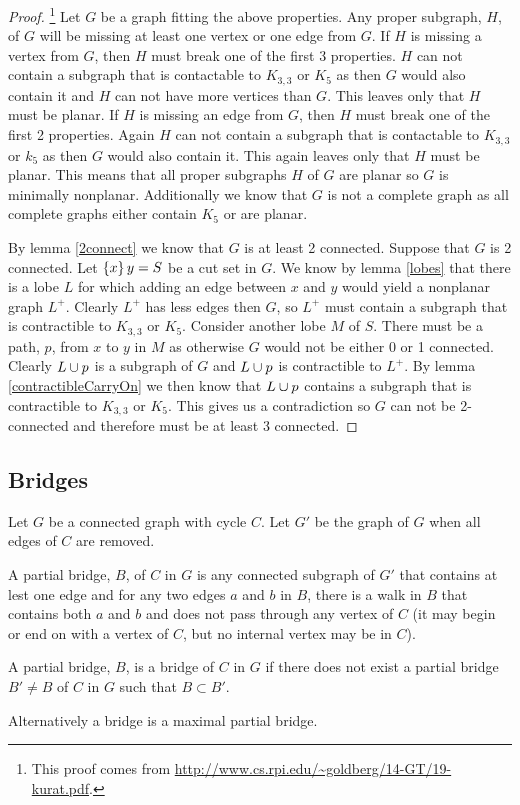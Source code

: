 \documentclass{article}
\begin{document}
\begin{proof}\footnote{This proof comes from \url{http://www.cs.rpi.edu/~goldberg/14-GT/19-kurat.pdf}.}
	Let $G$ be a graph fitting the above properties. Any proper subgraph, $H$, of $G$ will be missing at least one vertex or one edge from $G$. If $H$ is missing a vertex from $G$, then $H$ must break one of the first 3 properties. $H$ can not contain a subgraph that is contactable to $K_{3,3}$ or $K_5$ as then $G$ would also contain it and $H$ can not have more vertices than $G$. This leaves only that $H$ must be planar. If $H$ is missing an edge from $G$, then $H$ must break one of the first 2 properties. Again $H$ can not contain a subgraph that is contactable to $K_{3,3}$ or $k_5$ as then $G$ would also contain it. This again leaves only that $H$ must be planar. This means that all proper subgraphs $H$ of $G$ are planar so $G$ is minimally nonplanar. Additionally we know that $G$ is not a complete graph as all complete graphs either contain $K_5$ or are planar.
	
	By lemma \ref{2connect} we know that $G$ is at least 2 connected. Suppose that $G$ is 2 connected. Let $\left\{ {x} \right\}y = S$ be a cut set in $G$. We know by lemma \ref{lobes} that there is a lobe $L$ for which adding an edge between $x$ and $y$ would yield a nonplanar graph $L^+$. Clearly $L^+$ has less edges then $G$, so $L^+$ must contain a subgraph that is contractible to $K_{3,3}$ or $K_{5}$. Consider another lobe $M$ of $S$. There must be a path, $p$, from $x$ to $y$ in $M$ as otherwise $G$ would not be either 0 or 1 connected. Clearly $L\cup p$ is a subgraph of $G$ and $L\cup p$ is contractible to $L^+$. By lemma \ref{contractibleCarryOn} we then know that $L\cup p$ contains a subgraph that is contractible to $K_{3,3}$ or $K_5$. This gives us a contradiction so $G$ can not be 2-connected and therefore must be at least 3 connected.
\end{proof}

\subsection{Bridges}

Let $G$ be a connected graph with cycle $C$. Let $G'$ be the graph of $G$ when all edges of $C$ are removed. 
\begin{definition}
	A partial bridge, $B$, of $C$ in $G$ is any connected subgraph of $G'$ that contains at lest one edge and for any two edges $a$ and $b$ in $B$, there is a walk in $B$ that contains both $a$ and $b$ and does not pass through any vertex of $C$ (it may begin or end on with a vertex of $C$, but no internal vertex may be in $C$). 
\end{definition}
\begin{definition}[bridge]
	A partial bridge, $B$, is a bridge of $C$ in $G$ if there does not exist a partial bridge $B'\not=B$ of $C$ in $G$ such that $B\subset B'$.
	
	Alternatively a bridge is a maximal partial bridge.
\end{definition}
\end{document}
